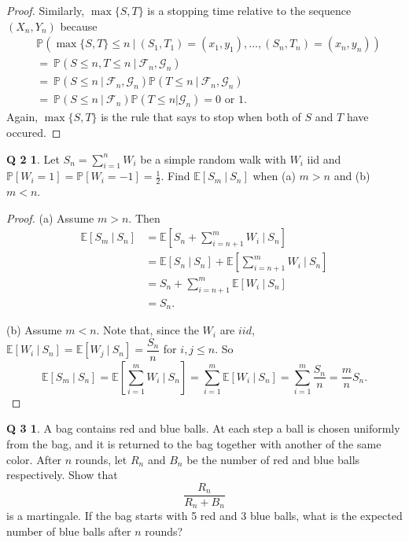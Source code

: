 \documentclass[12pt]{article}
\newcommand{\p}{\mathbb{P}}
\newcommand{\E}{\mathbb{E}}
\theoremstyle{definition}
\newtheorem*{prob2}{Q 2}
\newtheorem*{prob3}{Q 3}
\begin{document}
\begin{proof}
Similarly, $\max \{S,T \}$ is a stopping time relative to the sequence $\left(X_n, Y_n\right)$ because
\begin{align*}
&\p\left(\max \{S, T \} \leq n \ | \ \left(S_1,T_1\right) = \left(x_1,y_1\right), \dots , \left(S_n,T_n\right) = \left(x_n,y_n\right) \right)
\\
&= \ \p\left(S \leq n, T \leq n \ | \ \mathcal{F}_n, \mathcal{G}_n \right)
\\
&= \ \p\left(S \leq n \ | \ \mathcal{F}_n, \mathcal{G}_n \right)\p\left(T \leq n \ | \ \mathcal{F}_n, \mathcal{G}_n \right)
\\
&= \ \p\left(S \leq n \ | \ \mathcal{F}_n \right)\p\left(T \leq n | \mathcal{G}_n \right) = 0 \text{ or } 1.
\end{align*}
Again, $\max \{S,T\}$ is the rule that says to stop when both of $S$ and $T$ have occured.
\end{proof}

\begin{prob2}

Let $S_n = \sum_{i=1}^n W_i$ be a simple random walk with $W_i$ iid and $\p[W_i = 1] = \p[W_i = -1] = \frac12$.  Find $\E\left[S_m \ | \ S_n\right]$ when (a) $m>n$ and (b) $m<n$.

\end{prob2}

\begin{proof}

(a) Assume $m > n$.  Then
\begin{align*}
\E\left[S_m \ | \ S_n\right] &= \E\left[ S_n + \sum_{i=n+1}^m W_i \ | \ S_n\right]
\\
&= \E\left[ S_n \ | \ S_n\right] + \E\left[\sum_{i=n+1}^m W_i \ | \ S_n\right]
\\
&= S_n + \sum_{i=n+1}^m \E\left[W_i \ | \ S_n\right]
\\
&= S_n.
\end{align*}

\noindent (b) Assume $m < n$.  Note that, since the $W_i$ are $iid$, $\E\left[W_i \ | \ S_n\right] = \E\left[W_j \ | \ S_n\right] = \dfrac{S_n}{n}$ for $i, j \leq n$.  So
$$\E\left[S_m \ | \ S_n\right] = \E\left[\sum_{i=1}^m W_i \ | \ S_n\right] = \sum_{i=1}^m \E\left[W_i \ | \ S_n\right] = \sum_{i=1}^m \dfrac{S_n}{n} = \frac{m}{n}S_n.$$

\end{proof}

\begin{prob3}
A bag contains red and blue balls. At each step a ball is chosen uniformly from the bag, and it is returned to the bag together with another of the same color. After $n$ rounds,
let $R_n$ and $B_n$ be the number of red and blue balls respectively. Show that $$\frac{R_n}{R_n + B_n}$$ is a martingale.  If the bag starts with 5 red and 3 blue balls, what is the expected number of blue balls after $n$ rounds?
\end{prob3}
\end{document}
